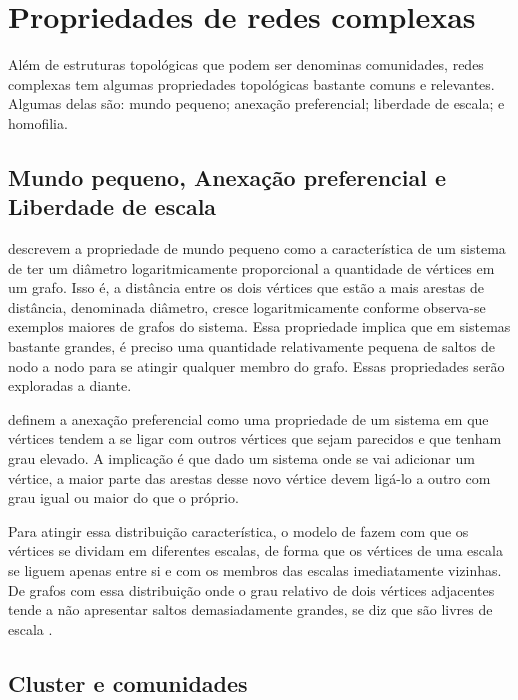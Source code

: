 \documentclass[notes.tex]{subfiles}
\begin{document}
\section{Propriedades de redes complexas\label{sec:propriedades_redes}}

Além de estruturas topológicas que podem ser denominas comunidades, redes complexas tem algumas propriedades topológicas bastante comuns e relevantes.
Algumas delas são: mundo pequeno; anexação preferencial; liberdade de escala; e homofilia.

\subsection{Mundo pequeno, Anexação preferencial e Liberdade de escala}

 descrevem a propriedade de mundo pequeno como a característica de um sistema de ter um diâmetro logaritmicamente proporcional a quantidade de vértices em um grafo.
Isso é, a distância entre os dois vértices que estão a mais arestas de distância, denominada diâmetro, cresce logaritmicamente conforme observa-se exemplos maiores de grafos do sistema.
Essa propriedade implica que em sistemas bastante grandes, é preciso uma quantidade relativamente pequena de saltos de nodo a nodo para se atingir qualquer membro do grafo.
Essas propriedades serão exploradas a diante.

 definem a anexação preferencial como uma propriedade de um sistema em que vértices tendem a se ligar com outros vértices que sejam parecidos e que tenham grau elevado.
A implicação é que dado um sistema onde se vai adicionar um vértice, a maior parte das arestas desse novo vértice devem ligá-lo a outro com grau igual ou maior do que o próprio.

Para atingir essa distribuição característica, o modelo de  fazem com que os vértices se dividam em diferentes escalas, de forma que os vértices de uma escala se liguem apenas entre si e com os membros das escalas imediatamente vizinhas.
De grafos com essa distribuição onde o grau relativo de dois vértices adjacentes tende a não apresentar saltos demasiadamente grandes, se diz que são livres de escala \cite{largeron2015generating}.

\subsection{Cluster e comunidades}
\end{document}

